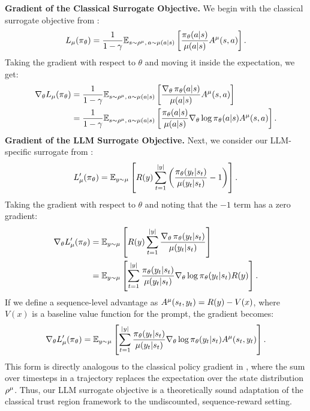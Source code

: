 \textbf{Gradient of the Classical Surrogate Objective.}  
We begin with the classical surrogate objective from :  
\begin{equation*}  
L_{\operatorname*{{\textcolor{black}{\mu}}}}({\operatorname*{{\textcolor{black}{\pi}}}}_\theta) = \frac{1}{1 - \gamma}  \mathbb{E}_{s \sim \rho^{\operatorname*{{\textcolor{black}{\mu}}}},\,a \sim \operatorname*{{\textcolor{black}{\mu}}}(a|s)} \left[ \frac{\operatorname*{{\textcolor{black}{\pi}}}_\theta(a| s)}{\operatorname*{{\textcolor{black}{\mu}}}(a| s)} A^{\operatorname*{{\textcolor{black}{\mu}}}}(s,a) \right].  
\end{equation*}  
Taking the gradient with respect to $\theta$ and moving it inside the expectation, we get:  
\begin{align}  
\label{eq:grad_classical}
\begin{split}
\nabla_\theta L_{\operatorname*{{\textcolor{black}{\mu}}}}({\operatorname*{{\textcolor{black}{\pi}}}}_\theta) &= \frac{1}{1 - \gamma} \mathbb{E}_{s \sim \rho^{\operatorname*{{\textcolor{black}{\mu}}}},\,a \sim \operatorname*{{\textcolor{black}{\mu}}}(a|s)} \left[ \frac{\nabla_\theta \operatorname*{{\textcolor{black}{\pi}}}_\theta(a| s)}{\operatorname*{{\textcolor{black}{\mu}}}(a| s)} A^{\operatorname*{{\textcolor{black}{\mu}}}}(s,a) \right] \\  
&= \frac{1}{1 - \gamma} \mathbb{E}_{s \sim \rho^{\operatorname*{{\textcolor{black}{\mu}}}},\,a \sim \operatorname*{{\textcolor{black}{\mu}}}(a|s)} \left[ \frac{\operatorname*{{\textcolor{black}{\pi}}}_\theta(a| s)}{\operatorname*{{\textcolor{black}{\mu}}}(a| s)} \nabla_\theta \log {\operatorname*{{\textcolor{black}{\pi}}}}_\theta(a| s) A^{\operatorname*{{\textcolor{black}{\mu}}}}(s,a) \right].  
\end{split}
\end{align}  
\textbf{Gradient of the LLM Surrogate Objective.}  
Next, we consider our LLM-specific surrogate from :  
\begin{equation*}  
L_{\operatorname*{{\textcolor{black}{\mu}}}}'({\operatorname*{{\textcolor{black}{\pi}}}}_\theta) = \mathbb{E}_{y \sim \operatorname*{{\textcolor{black}{\mu}}}} \left[ R(y) \sum_{t=1}^{|y|} \left( \frac{\operatorname*{{\textcolor{black}{\pi}}}_\theta(y_t|s_t)}{\operatorname*{{\textcolor{black}{\mu}}}(y_t|s_t)} - 1 \right) \right].  
\end{equation*}  
Taking the gradient with respect to $\theta$ and noting that the $-1$ term has a zero gradient:  
\begin{align*}  
\nabla_\theta L_{\operatorname*{{\textcolor{black}{\mu}}}}'({\operatorname*{{\textcolor{black}{\pi}}}}_\theta) &= \mathbb{E}_{y \sim \operatorname*{{\textcolor{black}{\mu}}}} \left[ R(y) \sum_{t=1}^{|y|} \frac{\nabla_\theta \operatorname*{{\textcolor{black}{\pi}}}_\theta(y_t|s_t)}{\operatorname*{{\textcolor{black}{\mu}}}(y_t|s_t)} \right] \\  
&= \mathbb{E}_{y \sim \operatorname*{{\textcolor{black}{\mu}}}} \left[ \sum_{t=1}^{|y|} \frac{\operatorname*{{\textcolor{black}{\pi}}}_\theta(y_t|s_t) }{\operatorname*{{\textcolor{black}{\mu}}}(y_t|s_t)} \nabla_\theta \log {\operatorname*{{\textcolor{black}{\pi}}}}_\theta(y_t|s_t) R(y) \right].  
\end{align*}  
If we define a sequence-level advantage as $A^{\operatorname*{{\textcolor{black}{\mu}}}}(s_t, y_t) = R(y) - V(x)$, where $V(x)$ is a baseline value function for the prompt, the gradient becomes:  
\begin{equation} 
\label{eq:grad_llm_surrogate}
\nabla_\theta L_{\operatorname*{{\textcolor{black}{\mu}}}}'({\operatorname*{{\textcolor{black}{\pi}}}}_\theta) = \mathbb{E}_{y \sim \operatorname*{{\textcolor{black}{\mu}}}} \left[ \sum_{t=1}^{|y|}  \frac{\operatorname*{{\textcolor{black}{\pi}}}_\theta(y_t|s_t) }{\operatorname*{{\textcolor{black}{\mu}}}(y_t|s_t)} \nabla_\theta \log {\operatorname*{{\textcolor{black}{\pi}}}}_\theta(y_t|s_t) A^{\operatorname*{{\textcolor{black}{\mu}}}}(s_t, y_t) \right].  
\end{equation}  
This form is directly analogous to the classical policy gradient in , where the sum over timesteps in a trajectory replaces the expectation over the state distribution $\rho^{\operatorname*{{\textcolor{black}{\mu}}}}$. Thus, our LLM surrogate objective is a theoretically sound adaptation of the classical trust region framework to the undiscounted, sequence-reward setting.



